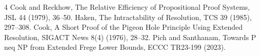\documentclass[11pt]{article}
\begin{document}
\begin{thebibliography}{4}
 Cook and Reckhow, The Relative Efficiency of Propositional Proof Systems, JSL 44 (1979), 36--50.
 Haken, The Intractability of Resolution, TCS 39 (1985), 297--308.
 Cook, A Short Proof of the Pigeon Hole Principle Using Extended Resolution, SIGACT News 8(4) (1976), 28--32.
 Pich and Santhanam, Towards P neq NP from Extended Frege Lower Bounds, ECCC TR23-199 (2023).
\end{thebibliography}
\end{document}
